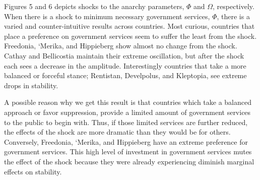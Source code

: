 \documentclass[12pt]{article}
\begin{document}
\begin{spacing}{1.5}
\begin{figure}[htb]
\end{figure}

Figures 5 and 6 depicts shocks to the anarchy parameters, $\Phi$ and $\Omega$, respectively. When there is a shock to minimum necessary government services, $\Phi$, there is a varied and counter-intuitive results across countries. Most curious, countries that place a preference on government services seem to suffer the least from the shock. Freedonia, `Merika, and Hippieberg show almost no change from the shock. Cathay and Bellicostia maintain their extreme oscillation, but after the shock each sees a decrease in the amplitude. Interestingly countries that take a more balanced or forceful stance; Rentistan, Develpolus, and Kleptopia, see extreme drops in stability. 

A possible reason why we get this result is that countries which take a balanced approach or favor suppression, provide a limited amount of government services to the public to begin with. Thus, if those limited services are further reduced, the effects of the shock are more dramatic than they would be for others. Conversely, Freedonia, `Merika, and Hippieberg have an extreme preference for government services. This high level of investment in government services mutes the effect of the shock because they were already experiencing diminish marginal effects on stability. 


\end{spacing}
\end{document}
